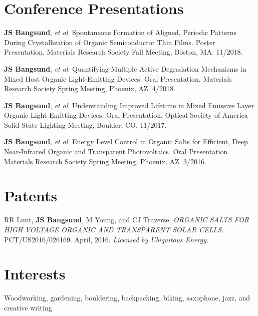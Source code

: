 \documentclass{article}
\renewenvironment{itemize}[1]{\begin{compactitem}#1}{\end{compactitem}}
\begin{document}
\section{Conference Presentations}
\begin{itemize}
\item[4] \textbf{JS Bangsund}, {\em et al}. Spontaneous Formation of Aligned, Periodic Patterns During Crystallization of Organic Semiconductor Thin Films. Poster Presentation. Materials Research Society Fall Meeting, Boston, MA. 11/2018.
\item[3] \textbf{JS Bangsund}, {\em et al}. Quantifying Multiple Active Degradation Mechanisms in Mixed Host Organic Light-Emitting Devices. Oral Presentation. Materials Research Society Spring Meeting, Phoenix, AZ. 4/2018.
\item[2] \textbf{JS Bangsund}, {\em et al}. Understanding Improved Lifetime in Mixed Emissive Layer Organic Light-Emitting Devices. Oral Presentation. Optical Society of America Solid-State Lighting Meeting, Boulder, CO. 11/2017.
\item[1] \textbf{JS Bangsund}, {\em et al}. Energy Level Control in Organic Salts for Efficient, Deep Near-Infrared Organic and Transparent Photovoltaics. Oral Presentation. Materials Research Society Spring Meeting, Phoenix, AZ. 3/2016.
\end{itemize}

\section{Patents}
RR Lunt, \textbf{JS Bangsund}, M Young, and CJ Traverse. {\em ORGANIC SALTS FOR HIGH VOLTAGE ORGANIC AND TRANSPARENT SOLAR CELLS}. PCT/US2016/026169. April, 2016. {\em Licensed by Ubiquitous Energy.}

\section{Interests}
Woodworking, gardening, bouldering, backpacking, biking, saxophone, jazz, and creative writing
\end{document}
